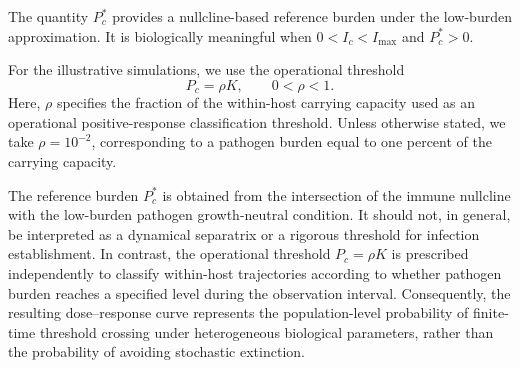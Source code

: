 \documentclass[11pt]{article}
\begin{document}
The quantity $P_c^*$ provides a nullcline-based
reference burden under the low-burden approximation.
It is biologically meaningful when
$0<I_c<I_{\max}$ and $P_c^*>0$.


For the illustrative simulations, we use the operational threshold
\begin{equation}
P_c=\rho K,\qquad 0<\rho<1.
\end{equation}
Here, $\rho$ specifies the fraction of the
within-host carrying capacity used as an
operational positive-response classification threshold.
Unless otherwise stated, we take $\rho=10^{-2}$,
corresponding to a pathogen burden equal to
one percent of the carrying capacity.



The reference burden $P_c^*$ is obtained from the
intersection of the immune nullcline with the
low-burden pathogen growth-neutral condition.
It should not, in general, be interpreted as a
dynamical separatrix or a rigorous threshold for
infection establishment. In contrast, the operational
threshold $P_c=\rho K$ is prescribed independently
to classify within-host trajectories according to
whether pathogen burden reaches a specified level
during the observation interval. Consequently, the
resulting dose--response curve represents the
population-level probability of finite-time threshold
crossing under heterogeneous biological parameters,
rather than the probability of avoiding stochastic
extinction.

\end{document}

